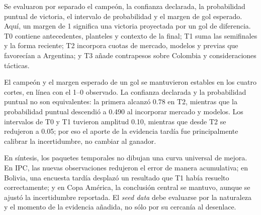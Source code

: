 \documentclass{article}
\begin{document}
Se evaluaron por separado el campeón, la confianza declarada, la probabilidad puntual de victoria, el intervalo de probabilidad y el margen de gol esperado. Aquí, un margen de 1 significa una victoria proyectada por un gol de diferencia. T0 contiene antecedentes, planteles y contexto de la final; T1 suma las semifinales y la forma reciente; T2 incorpora cuotas de mercado, modelos y previas que favorecían a Argentina; y T3 añade contrapesos sobre Colombia y consideraciones tácticas.

\begin{table}[H]
    \centering
    \small
    \caption{Salida deportiva por corte temporal; la final fue Argentina 1--0 Colombia.}
    \label{tab:seed_copa}
\end{table}

El campeón y el margen esperado de un gol se mantuvieron estables en los cuatro cortes, en línea con el 1--0 observado. La confianza declarada y la probabilidad puntual no son equivalentes: la primera alcanzó 0.78 en T2, mientras que la probabilidad puntual descendió a 0.490 al incorporar mercado y modelos. Los intervalos de T0 y T1 tuvieron amplitud 0.10, mientras que desde T2 se redujeron a 0.05; por eso el aporte de la evidencia tardía fue principalmente calibrar la incertidumbre, no cambiar al ganador.

En síntesis, los paquetes temporales no dibujan una curva universal de mejora. En IPC, las nuevas observaciones redujeron el error de manera acumulativa; en Bolivia, una encuesta tardía desplazó un resultado que T1 había resuelto correctamente; y en Copa América, la conclusión central se mantuvo, aunque se ajustó la incertidumbre reportada. El \textit{seed data} debe evaluarse por la naturaleza y el momento de la evidencia añadida, no sólo por su cercanía al desenlace.
\end{document}
